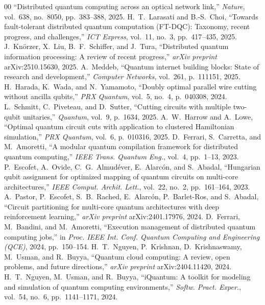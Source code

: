 \documentclass[conference]{IEEEtran}
\begin{document}
\begin{thebibliography}{00}
``Distributed quantum computing across an optical network link,'' \emph{Nature},
vol.~638, no.~8050, pp.~383--388, 2025.
 H.~T.~Larasati and B.-S.~Choi, ``Towards
fault-tolerant distributed quantum computation (FT-DQC): Taxonomy, recent
progress, and challenges,'' \emph{ICT Express}, vol.~11, no.~3, pp.~417--435,
2025.
 J.~Kn\"orzer, X.~Liu, B.~F.~Schiffer, and J.~Tura,
``Distributed quantum information processing: A review of recent progress,''
\emph{arXiv preprint} arXiv:2510.15630, 2025.
 A.~Meddeb, ``Quantum internet building blocks:
State of research and development,'' \emph{Computer Networks}, vol.~261,
p.~111151, 2025.
 H.~Harada, K.~Wada, and N.~Yamamoto, ``Doubly optimal
parallel wire cutting without ancilla qubits,'' \emph{PRX Quantum}, vol.~5,
no.~4, p.~040308, 2024.
 L.~Schmitt, C.~Piveteau, and D.~Sutter, ``Cutting
circuits with multiple two-qubit unitaries,'' \emph{Quantum}, vol.~9, p.~1634,
2025.
 A.~W.~Harrow and A.~Lowe, ``Optimal quantum circuit
cuts with application to clustered Hamiltonian simulation,'' \emph{PRX Quantum},
vol.~6, p.~010316, 2025.
 D.~Ferrari, S.~Carretta, and M.~Amoretti, ``A
modular quantum compilation framework for distributed quantum computing,''
\emph{IEEE Trans. Quantum Eng.}, vol.~4, pp.~1--13, 2023.
 P.~Escofet, A.~Ovide, C.~G.~Almud\'ever,
E.~Alarc\'on, and S.~Abadal, ``Hungarian qubit assignment for optimized mapping
of quantum circuits on multi-core architectures,'' \emph{IEEE Comput. Archit.
Lett.}, vol.~22, no.~2, pp.~161--164, 2023.
 A.~Pastor, P.~Escofet, S.~B.~Rached,
E.~Alarc\'on, P.~Barlet-Ros, and S.~Abadal, ``Circuit partitioning for multi-core
quantum architectures with deep reinforcement learning,'' \emph{arXiv preprint}
arXiv:2401.17976, 2024.
 D.~Ferrari, M.~Bandini, and M.~Amoretti,
``Execution management of distributed quantum computing jobs,'' in \emph{Proc.
IEEE Int. Conf. Quantum Computing and Engineering (QCE)}, 2024, pp.~150--154.
 H.~T.~Nguyen, P.~Krishnan, D.~Krishnaswamy, M.~Usman,
and R.~Buyya, ``Quantum cloud computing: A review, open problems, and future
directions,'' \emph{arXiv preprint} arXiv:2404.11420, 2024.
 H.~T.~Nguyen, M.~Usman, and R.~Buyya, ``iQuantum: A
toolkit for modeling and simulation of quantum computing environments,''
\emph{Softw. Pract. Exper.}, vol.~54, no.~6, pp.~1141--1171, 2024.
\end{thebibliography}
\end{document}
